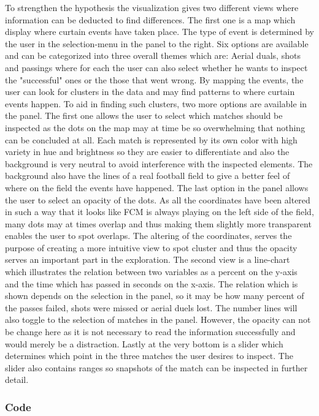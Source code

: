 \documentclass[Report.tex]{subfiles}
\begin{document}
To strengthen the hypothesis the visualization gives two different views where information can be deducted to find differences. The first one is a map which display where curtain events have taken place. The type of event is determined by the user in the selection-menu in the panel to the right. Six options are available and can be categorized into three overall themes which are: Aerial duals, shots and passings where for each the user can also select whether he wants to inspect the "successful" ones or the those that went wrong. By mapping the events, the user can look for clusters in the data and may find patterns to where curtain events happen. To aid in finding such clusters, two more options are available in the panel. The first one allows the user to select which matches should be inspected as the dots on the map may at time be so overwhelming that nothing can be concluded at all. Each match is represented by its own color with high variety in hue and brightness so they are easier to differentiate and also the background is very neutral to avoid interference with the inspected elements. The background also have the lines of a real football field to give a better feel of where on the field the events have happened. The last option in the panel allows the user to select an opacity of the dots. As all the coordinates have been altered in such a way that it looks like FCM is always playing on the left side of the field, many dots may at times overlap and thus making them slightly more transparent enables the user to spot overlaps. The altering of the coordinates, serves the purpose of creating a more intuitive view to spot cluster and thus the opacity serves an important part in the exploration. The second view is a line-chart which illustrates the relation between two variables as a percent on the y-axis and the time which has passed in seconds on the x-axis. The relation which is shown depends on the selection in the panel, so it may be how many percent of the passes failed, shots were missed or aerial duels lost. The number lines will also toggle to the selection of matches in the panel. However, the opacity can not be change here as it is not necessary to read the information successfully and would merely be a distraction. Lastly at the very bottom is a slider which determines which point in the three matches the user desires to inspect. The slider also contains ranges so snapshots of the match can be inspected in further detail.
\subsubsection*{Code}
\end{document}

